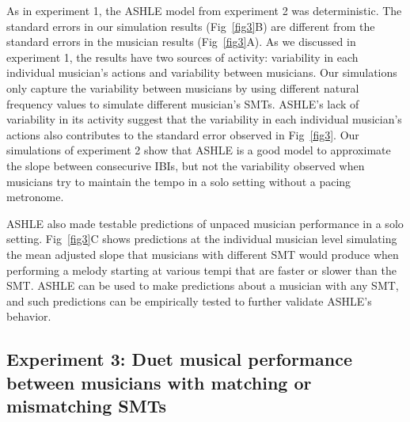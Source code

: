 \documentclass[10pt,letterpaper]{article}
\begin{document}
As in experiment 1, the ASHLE model from experiment 2 was deterministic. The standard errors in our simulation results (Fig~\ref{fig3}B) are different from the standard errors in the musician results (Fig~\ref{fig3}A). As we discussed in experiment 1, the results have two sources of activity: variability in each individual musician's actions and variability between musicians. Our simulations only capture the variability between musicians by using different natural frequency values to simulate different musician's SMTs. ASHLE's lack of variability in its activity suggest that the variability in each individual musician's actions also contributes to the standard error observed in Fig~\ref{fig3}. Our simulations of experiment 2 show that ASHLE is a good model to approximate the slope between consecurive IBIs, but not the variability observed when musicians try to maintain the tempo in a solo setting without a pacing metronome.

ASHLE also made testable predictions of unpaced musician performance in a solo setting. Fig~\ref{fig3}C shows predictions at the individual musician level simulating the mean adjusted slope that musicians with different SMT would produce when performing a melody starting at various tempi that are faster or slower than the SMT. ASHLE can be used to make predictions about a musician with any SMT, and such predictions can be empirically tested to further validate ASHLE's behavior.

\subsection*{Experiment 3: Duet musical performance between musicians with matching or mismatching SMTs}
\end{document}
